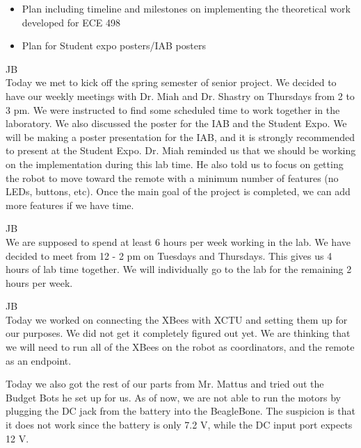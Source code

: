 \documentclass[fontsize=11pt, %
                             paper=letter, %
                             openany, %
                             captions=tableheading,
                             index=totoc,
                             hyperref]{labbook}
\begin{document}
\begin{addmargin}[0cm]{0cm}
\begin{itemize}
  \item Plan including timeline and milestones  on implementing the theoretical work developed for ECE 498

  \item Plan for Student expo posters/IAB posters     

\end{itemize}


JB\\
Today we met to kick off the spring semester of senior project. We decided to have our weekly meetings with Dr. Miah and Dr. Shastry on Thursdays from 2 to 3 pm. We were instructed to find some scheduled time to work together in the laboratory. We also discussed the poster for the IAB and the Student Expo. We will be making a poster presentation for the IAB, and it is strongly recommended to present at the Student Expo. Dr. Miah reminded us that we should be working on the implementation during this lab time. He also told us to focus on getting the robot to move toward the remote with a minimum number of features (no LEDs, buttons, etc). Once the main goal of the project is completed, we can add more features if we have time.


JB\\
We are supposed to spend at least 6 hours per week working in the lab. We have decided to meet from 12 - 2 pm on Tuesdays and Thursdays. This gives us 4 hours of lab time together. We will individually go to the lab for the remaining 2 hours per week.



JB\\
Today we worked on connecting the XBees with XCTU and setting them up for our purposes. We did not get it completely figured out yet. We are thinking that we will need to run all of the XBees on the robot as coordinators, and the remote as an endpoint.

Today we also got the rest of our parts from Mr. Mattus and tried out the Budget Bots he set up for us. As of now, we are not able to run the motors by plugging the DC jack from the battery into the BeagleBone. The suspicion is that it does not work since the battery is only 7.2 V, while the DC input port expects 12 V.


\end{addmargin}
\end{document}
